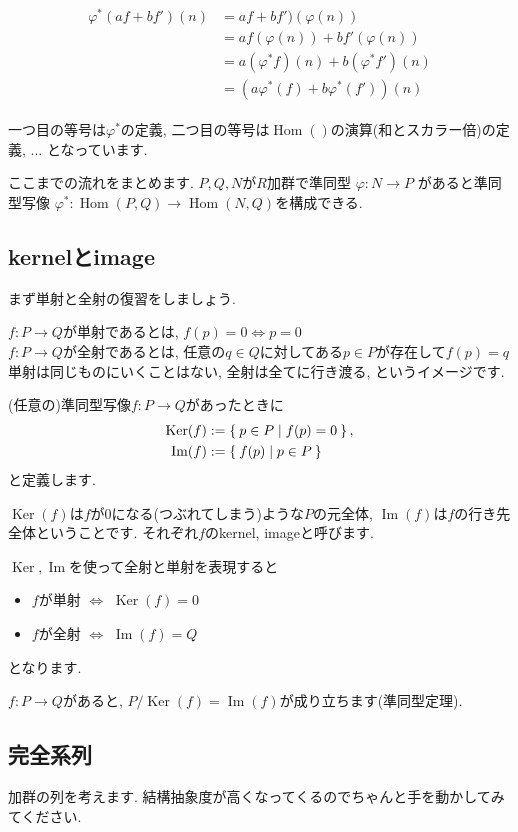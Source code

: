 \documentclass{jsarticle}
\newcommand{\makeop}[1]{\mathop{\mathrm{#1}}\nolimits}
\def\Im{\makeop{Im}}
\def\Ker{\makeop{Ker}}
\def\Hom{\makeop{Hom}}
\theoremstyle{definition}
\numberwithin{theorem}{section}
\begin{document}
\begin{eqnarray*}
\begin{aligned}
\varphi^*(af+bf')(n) &= af+bf')(\varphi(n))\\
&= af(\varphi(n)) + bf'(\varphi(n))\\
&= a(\varphi^*f)(n)+b(\varphi^*f')(n)\\
&= (a\varphi^*(f)+b\varphi^*(f'))(n)
\end{aligned}
\end{eqnarray*}

一つ目の等号は$\varphi^*$の定義, 二つ目の等号は$\Hom()$の演算(和とスカラー倍)の定義, ... となっています.

ここまでの流れをまとめます. $P, Q, N$が$R$加群で準同型 $\varphi: N \rightarrow P$ があると準同型写像
$\varphi^*: \Hom(P, Q) \rightarrow \Hom(N, Q)$を構成できる. 

\subsection{kernelとimage}
まず単射と全射の復習をしましょう.

$f: P \rightarrow Q$が単射であるとは, $f(p) = 0\Leftrightarrow p = 0$\\
$f: P \rightarrow Q$が全射であるとは, 任意の$q\in Q$に対してある$p\in P$が存在して$f(p) = q$\\

単射は同じものにいくことはない, 全射は全てに行き渡る, というイメージです.

(任意の)準同型写像$f: P \rightarrow Q$があったときに
\begin{eqnarray*}
\Ker(f) &:= \Set{p \in P | f(p) = 0},\\
\Im(f) &:= \Set{f(p) | p\in P}
\end{eqnarray*}
と定義します.

$\Ker(f)$は$f$が0になる(つぶれてしまう)ような$P$の元全体, $\Im(f)$は$f$の行き先全体ということです. それぞれ$f$のkernel, imageと呼びます.

$\Ker, \Im$を使って全射と単射を表現すると
\begin{itemize}
\item $f$が単射 $\Leftrightarrow$ $\Ker(f) = 0$
\item $f$が全射 $\Leftrightarrow$ $\Im(f) = Q$
\end{itemize}
となります.

$f: P \rightarrow Q$があると, $P/\Ker(f) = \Im(f)$が成り立ちます(準同型定理).

\subsection{完全系列}
加群の列を考えます. 結構抽象度が高くなってくるのでちゃんと手を動かしてみてください.
\end{document}
